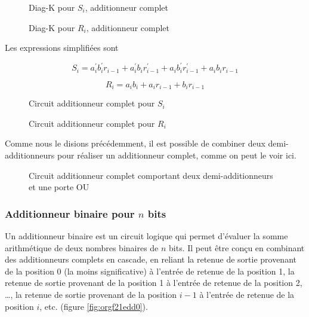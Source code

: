 \documentclass[11pt]{article}
\begin{document}
\begin{figure}[htbp]
\centering

\caption{\label{fig:orgcfe0031}Diag-K pour \(S_i\), additionneur complet}
\end{figure}


\begin{figure}[htbp]
\centering

\caption{\label{fig:orgc00a591}Diag-K pour \(R_i\), additionneur complet}
\end{figure}


Les expressions simplifiées sont 

$$ S_{i} = a_i^\prime b_i^\prime r_{i-1} + a_i^\prime b_i
r_{i-1}^\prime + a_i b_i^\prime r_{i-1}^\prime + a_i b_i r_{i-1} $$

$$ R_{i} = a_i b_i + a_i r_{i-1} + b_i r_{i-1} $$

\begin{figure}[htbp]
\centering

\caption{\label{fig:orgcdb90f2}Circuit additionneur complet pour \(S_i\)}
\end{figure}



\begin{figure}[htbp]
\centering

\caption{\label{fig:org8fba985}Circuit additionneur complet pour \(R_i\)}
\end{figure}


Comme nous le disions précédemment, il est possible de combiner deux
demi-additionneurs pour réaliser un additionneur complet, comme on
peut le voir ici.


\begin{figure}[htbp]
\centering

\caption{\label{fig:orgdc581ae}Circuit additionneur complet comportant deux demi-additionneurs et une porte OU}
\end{figure}

\subsubsection{Additionneur binaire pour \(n\) bits}
\label{sec:orgce87113}

Un additionneur binaire est un circuit logique qui permet d'évaluer la
somme arithmétique de deux nombres binaires de \(n\) bits. Il peut
être conçu en combinant des additionneurs complets en cascade, en
reliant la retenue de sortie provenant de la position 0 (la moins
significative) à l'entrée de retenue de la position 1, la retenue de
sortie provenant de la position 1 à l'entrée de retenue de la position
2, \ldots{}, la retenue de sortie provenant de la position \(i-1\) à l'entrée
de retenue de la position \(i\), etc. (figure \ref{fig:orgf21edd0}).
\end{document}
